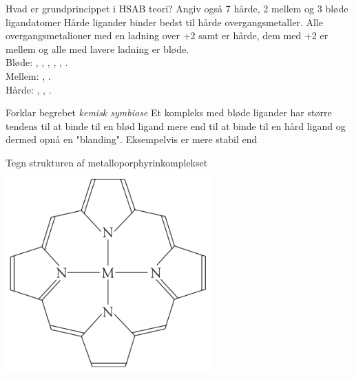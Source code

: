 \begin{flashcard}[Teori]{Hvad er grundprincippet i HSAB teori?
Angiv også 7 hårde, 2 mellem og 3 bløde ligandatomer}
Hårde ligander binder bedst til hårde overgangsmetaller.
Alle overgangsmetalioner med en ladning over +2 samt  er hårde, dem med +2 er mellem og alle med lavere ladning er bløde.\\\vspace*{0.3cm}
Bløde: , , , , , .\\
Mellem: , .\\
Hårde: , , .  
\end{flashcard}


\begin{flashcard}[Teori]{Forklar begrebet \textit{kemisk symbiose}}
Et kompleks med bløde ligander har større tendens til at binde til en blød ligand mere end til at binde til en hård ligand og dermed opnå en "blanding".
Eksempelvis er  mere stabil end 
\end{flashcard}


\begin{flashcard}[Struktur]{Tegn strukturen af metalloporphyrinkomplekset}
\includegraphics[width=0.6\textwidth]{figures/k19s529porphyrin.png}
\end{flashcard}